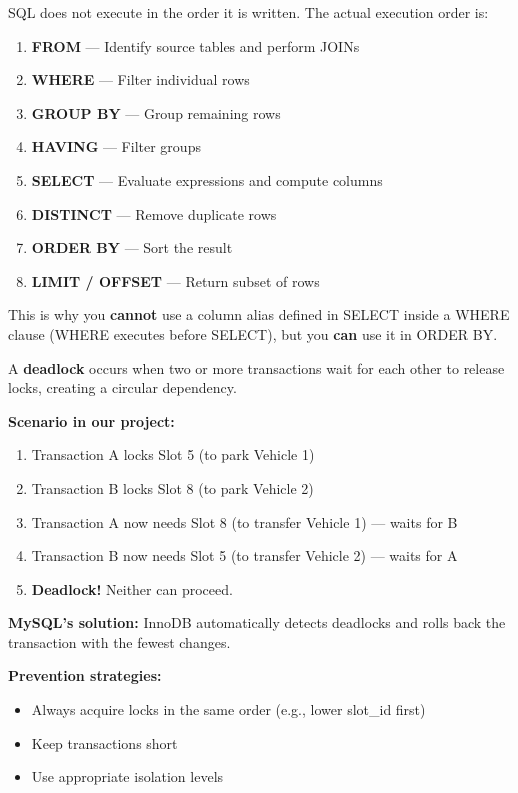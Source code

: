 \documentclass[12pt,a4paper]{article}
\begin{document}
\begin{questionbox}
\end{questionbox}
\begin{answerbox}
SQL does not execute in the order it is written. The actual execution order is:

\begin{enumerate}[nosep]
    \item \textbf{FROM} --- Identify source tables and perform JOINs
    \item \textbf{WHERE} --- Filter individual rows
    \item \textbf{GROUP BY} --- Group remaining rows
    \item \textbf{HAVING} --- Filter groups
    \item \textbf{SELECT} --- Evaluate expressions and compute columns
    \item \textbf{DISTINCT} --- Remove duplicate rows
    \item \textbf{ORDER BY} --- Sort the result
    \item \textbf{LIMIT / OFFSET} --- Return subset of rows
\end{enumerate}

This is why you \textbf{cannot} use a column alias defined in SELECT inside a WHERE clause (WHERE executes before SELECT), but you \textbf{can} use it in ORDER BY.
\end{answerbox}

\begin{questionbox}
\end{questionbox}
\begin{answerbox}
A \textbf{deadlock} occurs when two or more transactions wait for each other to release locks, creating a circular dependency.

\textbf{Scenario in our project:}
\begin{enumerate}[nosep]
    \item Transaction A locks Slot 5 (to park Vehicle 1)
    \item Transaction B locks Slot 8 (to park Vehicle 2)
    \item Transaction A now needs Slot 8 (to transfer Vehicle 1) --- waits for B
    \item Transaction B now needs Slot 5 (to transfer Vehicle 2) --- waits for A
    \item \textbf{Deadlock!} Neither can proceed.
\end{enumerate}

\textbf{MySQL's solution:} InnoDB automatically detects deadlocks and rolls back the transaction with the fewest changes.

\textbf{Prevention strategies:}
\begin{itemize}[nosep]
    \item Always acquire locks in the same order (e.g., lower slot\_id first)
    \item Keep transactions short
    \item Use appropriate isolation levels
\end{itemize}
\end{answerbox}
\end{document}
